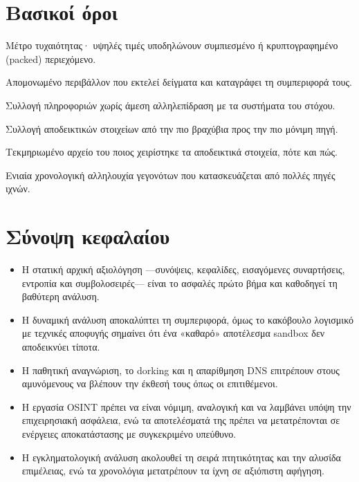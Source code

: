 \section*{Βασικοί όροι}
\begin{description}[style=nextline,leftmargin=1.2em]
  \item[Εντροπία] Μέτρο τυχαιότητας· υψηλές τιμές υποδηλώνουν συμπιεσμένο ή κρυπτογραφημένο (packed) περιεχόμενο.
  \item[Sandbox] Απομονωμένο περιβάλλον που εκτελεί δείγματα και καταγράφει τη συμπεριφορά τους.
  \item[Παθητική αναγνώριση] Συλλογή πληροφοριών χωρίς άμεση αλληλεπίδραση με τα συστήματα του στόχου.
  \item[Σειρά πτητικότητας] Συλλογή αποδεικτικών στοιχείων από την πιο βραχύβια προς την πιο μόνιμη πηγή.
  \item[Αλυσίδα επιμέλειας] Τεκμηριωμένο αρχείο του ποιος χειρίστηκε τα αποδεικτικά στοιχεία, πότε και πώς.
  \item[Υπερ-χρονολόγιο] Ενιαία χρονολογική αλληλουχία γεγονότων που κατασκευάζεται από πολλές πηγές ιχνών.
\end{description}

\section*{Σύνοψη κεφαλαίου}
\begin{itemize}
  \item Η στατική αρχική αξιολόγηση —συνόψεις, κεφαλίδες, εισαγόμενες συναρτήσεις, εντροπία και συμβολοσειρές— είναι το ασφαλές πρώτο βήμα και καθοδηγεί τη βαθύτερη ανάλυση.
  \item Η δυναμική ανάλυση αποκαλύπτει τη συμπεριφορά, όμως το κακόβουλο λογισμικό με τεχνικές αποφυγής σημαίνει ότι ένα «καθαρό» αποτέλεσμα sandbox δεν αποδεικνύει τίποτα.
  \item Η παθητική αναγνώριση, το dorking και η απαρίθμηση DNS επιτρέπουν στους αμυνόμενους να βλέπουν την έκθεσή τους όπως οι επιτιθέμενοι.
  \item Η εργασία OSINT πρέπει να είναι νόμιμη, αναλογική και να λαμβάνει υπόψη την επιχειρησιακή ασφάλεια, ενώ τα αποτελέσματά της πρέπει να μετατρέπονται σε ενέργειες αποκατάστασης με συγκεκριμένο υπεύθυνο.
  \item Η εγκληματολογική ανάλυση ακολουθεί τη σειρά πτητικότητας και την αλυσίδα επιμέλειας, ενώ τα χρονολόγια μετατρέπουν τα ίχνη σε αξιόπιστη αφήγηση.
\end{itemize}

